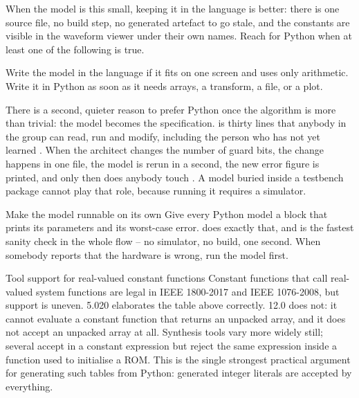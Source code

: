 When the model is this small, keeping it in the \RTL{} language is better:
there is one source file, no build step, no generated artefact to go stale,
and the constants are visible in the waveform viewer under their own names.
Reach for Python when at least one of the following is true.

\begin{ruleofthumb}
Write the model in the \RTL{} language if it fits on one screen and uses only
arithmetic. Write it in Python as soon as it needs arrays, a transform, a
file, or a plot.
\end{ruleofthumb}

There is a second, quieter reason to prefer Python once the algorithm is more
than trivial: the model becomes the specification. 
is thirty lines that anybody in the group can read, run and modify, including
the person who has not yet learned \SV{}. When the architect changes the
number of guard bits, the change happens in one file, the model is rerun in a
second, the new error figure is printed, and only then does anybody touch
\RTL{}. A model buried inside a testbench package cannot play that role,
because running it requires a simulator.

\begin{tipbox}{Make the model runnable on its own}
Give every Python model a  block that prints its
parameters and its worst-case error.  does exactly
that, and  is the fastest sanity check in the
whole flow -- no simulator, no build, one second. When somebody reports that
the hardware is wrong, run the model first.
\end{tipbox}

\begin{notebox}{Tool support for real-valued constant functions}
Constant functions that call real-valued system functions are legal in IEEE
1800-2017 and IEEE 1076-2008, but support is uneven.  5.020
elaborates the  table above correctly. 
12.0 does not: it cannot evaluate a constant function that returns an
unpacked array, and it does not accept an unpacked array  at
all. Synthesis tools vary more widely still; several accept
 in a constant expression but reject the same
expression inside a function used to initialise a ROM. This is the single
strongest practical argument for generating such tables from Python:
generated integer literals are accepted by everything.
\end{notebox}

